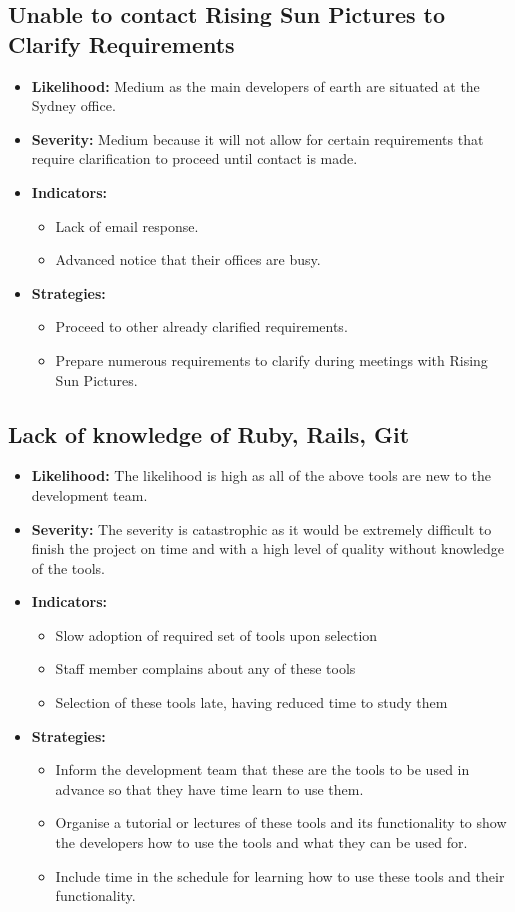 \documentclass{article}
\begin{document}
\subsection{Unable to contact Rising Sun Pictures to Clarify Requirements}
\begin{itemize}
	\item \textbf{Likelihood:} Medium as the main developers of earth are situated at the Sydney office.
	\item \textbf{Severity:} Medium because it will not allow for certain requirements that require clarification to proceed until contact is made.
	\item \textbf{Indicators:} 
		\begin{itemize}
			\item Lack of email response.
			\item Advanced notice that their offices are busy.
		\end{itemize}
	\item \textbf{Strategies:} 
		\begin{itemize}
			\item Proceed to other already clarified requirements.
			\item Prepare numerous requirements to clarify during meetings with Rising Sun Pictures.
		\end{itemize}
\end{itemize}

\subsection{Lack of knowledge of Ruby, Rails, Git}
\begin{itemize}
	\item \textbf{Likelihood:} The likelihood is high as all of the above tools are new to the development team.
	\item \textbf{Severity:} The severity is catastrophic as it would be extremely difficult to finish the project on time and with a high level of quality without knowledge of the tools.
	\item \textbf{Indicators:}
		\begin{itemize}
			\item Slow adoption of required set of tools upon selection
			\item Staff member complains about any of these tools
			\item Selection of these tools late, having reduced time to study them
		\end{itemize}
	\item \textbf{Strategies:} 
		\begin{itemize}
			\item Inform the development team that these are the tools to be used in advance so that they have time learn to use them.
			\item Organise a tutorial or lectures of these tools and its functionality to show the developers how to use the tools and what they can be used for.
			\item Include time in the schedule for learning how to use these tools and their functionality.
		\end{itemize}
\end{itemize}
\end{document}
